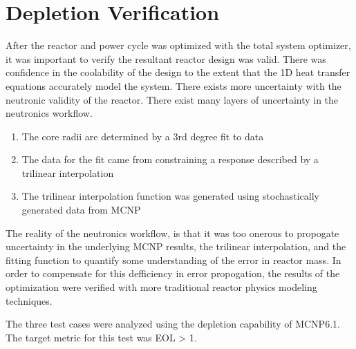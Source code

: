\section{Depletion Verification}
After the reactor and power cycle was optimized with the total system optimizer,
it was important to verify the resultant reactor design was valid. There was
confidence in the coolability of the design to the extent that the 1D heat
transfer equations accurately model the system. There exists more uncertainty
with the neutronic validity of the reactor. There exist many layers of
uncertainty in the neutronics workflow.

\onehalfspacing
\begin{enumerate}
    \item The core radii are determined by a 3rd degree fit to data
    \item The data for the fit came from constraining a \keff response described
        by a trilinear interpolation
    \item The trilinear interpolation function was generated using stochastically
        generated \keff data from MCNP
\end{enumerate}
\doublespacing

The reality of the neutronics workflow, is that it was too onerous to propogate
uncertainty in the underlying MCNP results, the trilinear interpolation, and the
fitting function to quantify some understanding of the error in reactor mass. In
order to compensate for this defficiency in error propogation, the results of
the optimization were verified with more traditional reactor physics modeling
techniques.

The three test cases were analyzed using the depletion capability of MCNP6.1.
The target metric for this test was EOL \keff > 1.
